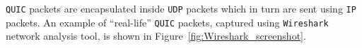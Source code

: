 \documentclass[12pt,a4paper]{report}
\newcommand\note[2]{{\color{#1}\bf #2}}
\newcommand\simon[1]{\ifcomments{\note{cyan}{SM: #1}}\fi}
\begin{document}
%





    


\texttt{QUIC} packets are encapsulated inside \texttt{UDP} packets which in turn are sent using \texttt{IP} packets.
An example of \enquote{real-life} \texttt{QUIC} packets, captured using \texttt{Wireshark} network analysis tool, is shown in Figure~\ref{fig:Wireshark_screenshot}.



\end{document}
